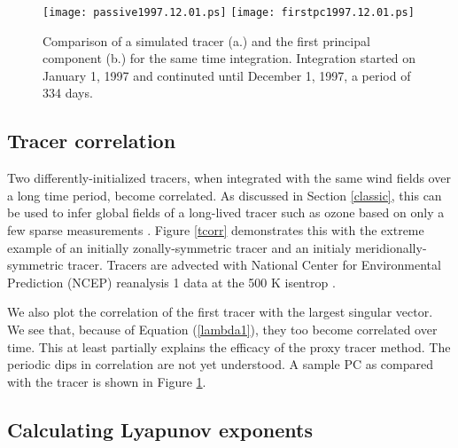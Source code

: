 \documentclass{article}
\begin{document}
\begin{figure}
\texttt{[image: passive1997.12.01.ps]}
\texttt{[image: firstpc1997.12.01.ps]}
\caption{Comparison of a simulated tracer (a.) and the first principal
component (b.) for the same time integration.
Integration started on January 1, 1997 and continuted until December 1, 1997, a period of 334 days.}\label{pc1}
\end{figure}

\subsection{Tracer correlation}

Two differently-initialized tracers, when integrated with the same
wind fields over a long time period, become correlated.
As discussed in Section \ref{classic},
this can be used to infer global fields of a long-lived tracer such as
ozone based on only a few sparse measurements 
\citep{Allen_Nakamura2003,Randall_etal2002}.
Figure \ref{tcorr} demonstrates this with the extreme example of an initially
zonally-symmetric tracer and an initialy meridionally-symmetric tracer.
Tracers are advected with National Center for Environmental Prediction
(NCEP) reanalysis 1 data at the 500 K isentrop \citep{Kalnay_etal1996}.

We also plot the correlation of the first tracer with the largest singular
vector.  We see that, because of Equation (\ref{lambda1}), they too become
correlated over time.
This at least partially explains the efficacy of the proxy tracer method.
The periodic dips in correlation are not yet understood.
A sample PC as compared with the tracer is shown in Figure \ref{pc1}.  

\subsection{Calculating Lyapunov exponents}

\label{Lyapunov_exponents}
\end{document}
